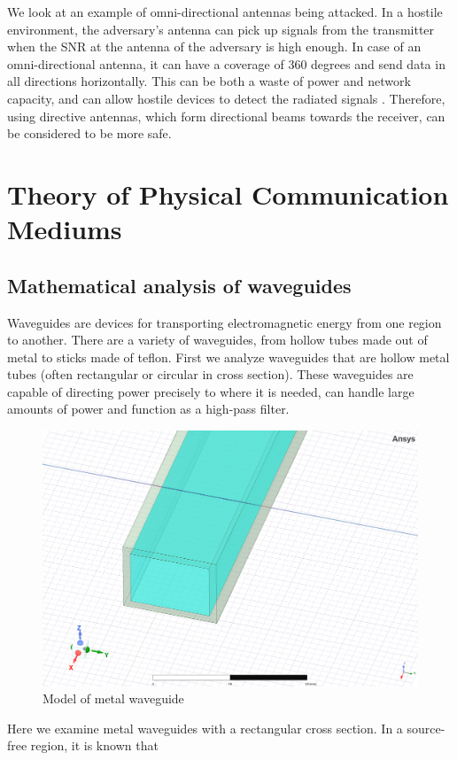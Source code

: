 \documentclass[a4paper,12pt]{report}
\begin{document}
We look at an example of omni-directional antennas being attacked.
In a hostile environment, the adversary's antenna can pick up signals from the
transmitter when the SNR at the antenna of the adversary is high enough.
In case of an omni-directional antenna, it can have a coverage of 360 degrees
and send data in all directions horizontally.
This can be both a waste of power and network capacity,
and can allow hostile devices to detect the radiated signals \cite{security_estimation_model}.
Therefore, using directive antennas, which form directional beams towards the receiver,
can be considered to be more safe.

\chapter{Theory of Physical Communication Mediums}

\section{Mathematical analysis of waveguides}

Waveguides are devices for transporting electromagnetic energy
from one region to another.
There are a variety of waveguides, from hollow tubes made out of metal to
sticks made of teflon.
First we analyze waveguides that are hollow metal tubes
(often rectangular or circular in cross section).
These waveguides are capable of directing power precisely to where it is needed,
can handle large amounts of power and function as a high-pass filter.

\begin{figure}
  \begin{center}
    \includegraphics[clip, keepaspectratio, width=0.5\linewidth]{img/metal_waveguide.png}
    \caption{Model of metal waveguide}
    \label{fig:metal_waveguide}
  \end{center}
\end{figure}

Here we examine metal waveguides with a rectangular cross section.
In a source-free region, it is known that
\end{document}
